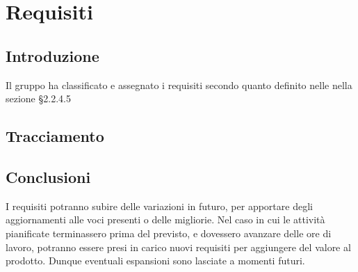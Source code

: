 \section{Requisiti}
\subsection{Introduzione}
Il gruppo \Gruppo{} ha classificato e assegnato i requisiti secondo quanto definito nelle  nella sezione §2.2.4.5





\subsection{Tracciamento}



\subsection{Conclusioni}
I requisiti potranno subire delle variazioni in futuro, per apportare degli aggiornamenti alle
voci presenti o delle migliorie. Nel caso in cui le attività pianificate terminassero prima del
previsto, e dovessero avanzare delle ore di lavoro, potranno essere presi in carico nuovi requisiti
per aggiungere del valore al prodotto. Dunque eventuali espansioni sono lasciate a momenti
futuri.